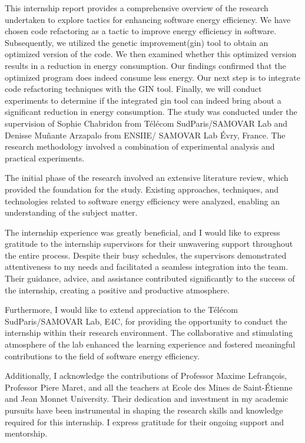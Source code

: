 This internship report provides a comprehensive overview of the research undertaken to explore tactics for enhancing software energy efficiency. We have chosen code refactoring as a tactic to improve energy efficiency in software. Subsequently, we utilized the genetic improvement(gin) tool to obtain an optimized version of the code. We then examined whether this optimized version results in a reduction in energy consumption. Our findings confirmed that the optimized program does indeed consume less energy. Our next step is to integrate code refactoring techniques with the GIN tool. Finally, we will conduct experiments to determine if the integrated gin tool can indeed bring about a significant reduction in energy consumption. The study was conducted under the supervision of Sophie Chabridon from  Télécom SudParis/SAMOVAR Lab and Denisse Muñante Arzapalo from ENSIIE/ SAMOVAR Lab Évry, France. The research methodology involved a combination of experimental analysis and practical experiments.\par

\vspace{5pt}
The initial phase of the research involved an extensive literature review, which provided the foundation for the study. Existing approaches, techniques, and technologies related to software energy efficiency were analyzed, enabling an understanding of the subject matter.\par

\vspace{5pt}
The internship experience was greatly beneficial, and I would like to express gratitude to the internship supervisors for their unwavering support throughout the entire process. Despite their busy schedules, the supervisors demonstrated attentiveness to my needs and facilitated a seamless integration into the team. Their guidance, advice, and assistance contributed significantly to the success of the internship, creating a positive and productive atmosphere.\par

\vspace{5pt}
Furthermore, I would like to extend appreciation to the Télécom SudParis/SAMOVAR Lab, E4C, for providing the opportunity to conduct the internship within their research environment. The collaborative and stimulating atmosphere of the lab enhanced the learning experience and fostered meaningful contributions to the field of software energy efficiency.\par

\vspace{5pt}
Additionally, I acknowledge the contributions of Professor Maxime Lefrançois, Professor Piere Maret, and all the teachers at Ecole des Mines de Saint-Étienne and Jean Monnet University. Their dedication and investment in my academic pursuits have been instrumental in shaping the research skills and knowledge required for this internship. I express gratitude for their ongoing support and mentorship.\par


